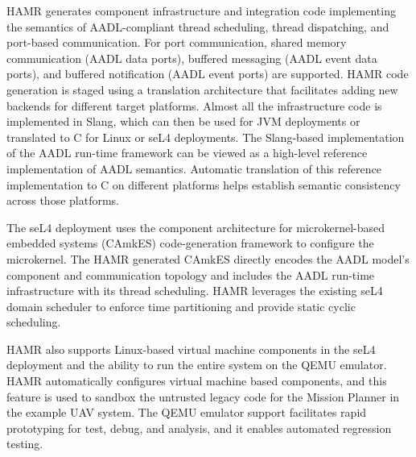 HAMR generates component infrastructure and integration code
implementing the semantics of AADL-compliant thread scheduling,
thread dispatching, and port-based communication.
For port communication, shared memory communication (AADL
data ports), buffered messaging (AADL event data ports), and
buffered notification (AADL event ports) are supported.
HAMR code generation is staged using a translation architecture
that facilitates adding new backends for different target
platforms.   Almost all the infrastructure code is implemented
in Slang, which can then be used for JVM deployments or
translated to C for Linux or seL4 deployments.
The Slang-based implementation of the AADL run-time framework
can be viewed as a high-level reference implementation of AADL
semantics.   Automatic translation of this reference
implementation to C on different platforms helps establish
semantic consistency across those platforms. 

The seL4 deployment uses the component architecture for microkernel-based embedded systems
(CAmkES) code-generation framework to configure the microkernel.
The HAMR generated CAmkES directly encodes the AADL model's component and communication
topology and includes the AADL run-time infrastructure with its thread scheduling.
HAMR leverages the existing seL4 domain scheduler to enforce time partitioning and provide static cyclic scheduling.

HAMR also supports Linux-based virtual machine components in the seL4 deployment and the ability to run the entire system on the QEMU emulator.
HAMR automatically configures virtual machine based components, and this feature is used to sandbox the untrusted legacy code for the Mission Planner in the example UAV system.
The QEMU emulator support facilitates rapid prototyping for test, debug, and analysis, and it enables automated regression testing.


